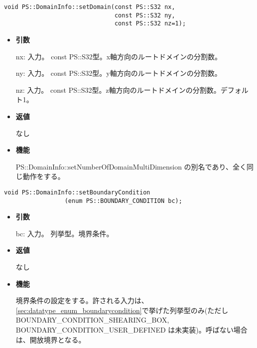 
\begin{screen}
\begin{verbatim}
void PS::DomainInfo::setDomain(const PS::S32 nx,
                               const PS::S32 ny,
                               const PS::S32 nz=1);
\end{verbatim}
\end{screen}

\begin{itemize}

\item {\bf 引数}

nx: 入力。 const PS::S32型。x軸方向のルートドメインの分割数。

ny: 入力。 const PS::S32型。y軸方向のルートドメインの分割数。

nz: 入力。 const PS::S32型。z軸方向のルートドメインの分割数。デフォル
ト1。

\item {\bf 返値}

なし

\item {\bf 機能}

PS::DomainInfo::setNumberOfDomainMultiDimension の別名であり、全く同じ動作をする。

\end{itemize}


\begin{screen}
\begin{verbatim}
void PS::DomainInfo::setBoundaryCondition
                 (enum PS::BOUNDARY_CONDITION bc);
\end{verbatim}
\end{screen}

\begin{itemize}

\item {\bf 引数}

bc: 入力。 列挙型。境界条件。

\item {\bf 返値}

なし

\item {\bf 機能}

境界条件の設定をする。許される入力は、
\ref{sec:datatype_enum_boundarycondition}で挙げた列挙型のみ(ただし
BOUNDARY\_CONDITION\_SHEARING\_BOX, BOUNDARY\_CONDITION\_USER\_DEFINED
は未実装)。呼ばない場合は、開放境界となる。

\end{itemize}

